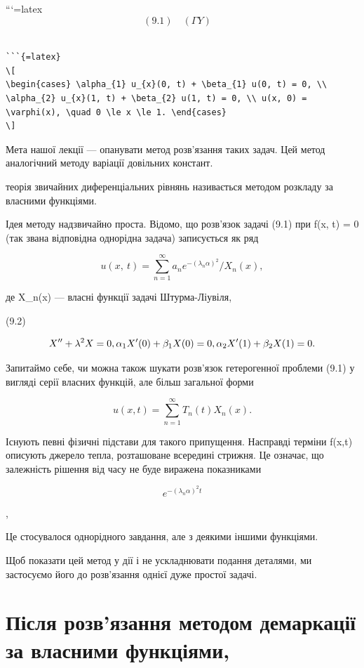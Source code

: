 \documentclass[
]{article}
\begin{document}
```{=latex}
\[
(9.1) \quad (\Gamma Y) \quad
\]

\begin{verbatim}

```{=latex}
\[
\begin{cases} \alpha_{1} u_{x}(0, t) + \beta_{1} u(0, t) = 0, \\ \alpha_{2} u_{x}(1, t) + \beta_{2} u(1, t) = 0, \\ u(x, 0) = \varphi(x), \quad 0 \le x \le 1. \end{cases}
\]
\end{verbatim}

Мета нашої лекції --- опанувати метод розв'язання таких задач. Цей метод
аналогічний методу варіації довільних констант.

теорія звичайних диференціальних рівнянь називається методом розкладу за
власними функціями.

Ідея методу надзвичайно проста. Відомо, що розв'язок задачі (9.1) при
f(x, t) = 0 (так звана відповідна однорідна задача) записується як ряд

\[
u\left(x,\ t\right)=\sum_{n=1}^{\infty}a_{n}e^{-\left(\lambda_{n}\alpha\right)^{2}}/X_{n}\left(x\right),
\]

де X\_n(x) --- власні функції задачі Штурма-Ліувіля,

(9.2)

\[
X'' + \lambda^2 X = 0, \\ \alpha_1 X'(0) + \beta_1 X(0) = 0, \\ \alpha_2 X'(1) + \beta_2 X(1) = 0.
\]

Запитаймо себе, чи можна також шукати розв'язок гетерогенної проблеми
(9.1) у вигляді серії власних функцій, але більш загальної форми

\[
u(x, t) = \sum_{n=1}^{\infty} T_n(t) X_n(x).
\]

Існують певні фізичні підстави для такого припущення. Насправді терміни
f(x,t) описують джерело тепла, розташоване всередині стрижня. Це
означає, що залежність рішення від часу не буде виражена показниками

\[
e^{-(\lambda_n\alpha)^2 t}
\]

,

Це стосувалося однорідного завдання, але з деякими іншими функціями.

Щоб показати цей метод у дії і не ускладнювати подання деталями, ми
застосуємо його до розв'язання однієї дуже простої задачі.

\section{Після розв'язання методом демаркації за власними
функціями,}\label{ux43fux456ux441ux43bux44f-ux440ux43eux437ux432ux44fux437ux430ux43dux43dux44f-ux43cux435ux442ux43eux434ux43eux43c-ux434ux435ux43cux430ux440ux43aux430ux446ux456ux457-ux437ux430-ux432ux43bux430ux441ux43dux438ux43cux438-ux444ux443ux43dux43aux446ux456ux44fux43cux438}
\end{document}
